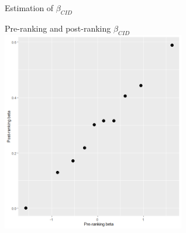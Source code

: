 \documentclass{beamer}
\begin{document}
\begin{frame}{Estimation of $\beta_{CID}$}
\end{frame}



\begin{frame}{Pre-ranking and post-ranking $\beta_{CID}$}
\includegraphics[width=0.60\textwidth]{paper_b3/Figure2.png}
\end{frame}
\end{document}
